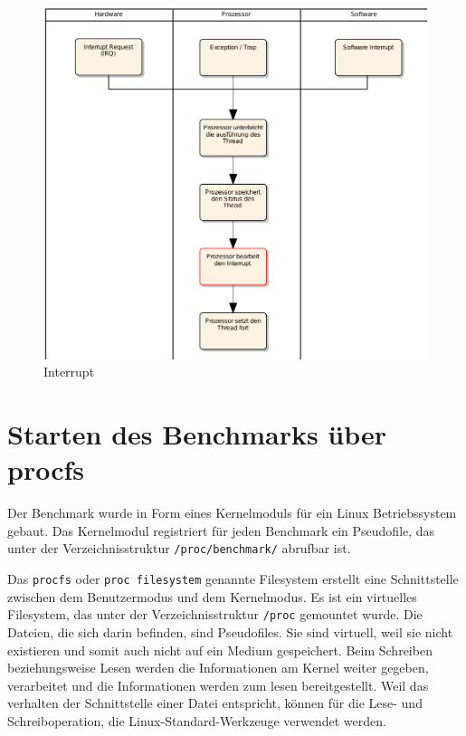 \begin{figure}[H]
\centering
\includegraphics[width=1.0\textwidth]{images/interrupt_ea.pdf}
\caption{Interrupt}
\label{fig:Interrupt}
\end{figure}

\section{Starten des Benchmarks über procfs}

Der Benchmark wurde in Form eines Kernelmoduls für ein Linux Betriebssystem gebaut. Das Kernelmodul registriert für jeden Benchmark ein Pseudofile, das unter der Verzeichnisstruktur \texttt{/proc/benchmark/} abrufbar ist.
\par
Das \texttt{procfs} oder \texttt{proc filesystem} genannte Filesystem erstellt eine Schnittstelle zwischen dem Benutzermodus und dem Kernelmodus. Es ist ein virtuelles Filesystem, das unter der Verzeichnisstruktur \texttt{/proc} gemountet wurde\cite{mauerer2010professional}. Die Dateien, die sich darin befinden, sind Pseudofiles. Sie sind virtuell, weil sie nicht existieren und somit auch nicht auf ein Medium gespeichert. Beim Schreiben beziehungsweise Lesen werden die Informationen am Kernel weiter gegeben, verarbeitet und die Informationen werden zum lesen bereitgestellt. Weil das verhalten der Schnittstelle einer Datei entspricht, können für die Lese- und Schreiboperation, die Linux-Standard-Werkzeuge verwendet werden.


